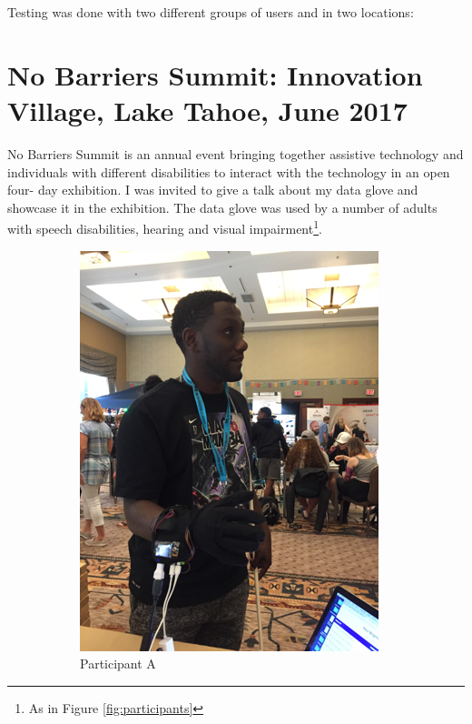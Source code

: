 Testing was done with two different groups of users and in two locations:

\section{No Barriers Summit: Innovation Village, Lake Tahoe, June 2017}

No Barriers Summit is an annual event bringing together assistive technology and individuals with different disabilities to interact with the technology in an open four- day exhibition. I was invited to give a talk about my data glove and showcase it in the exhibition. The data glove was used by a number of adults with speech disabilities, hearing and visual impairment\footnote{As in Figure \ref{fig:participants}}.

\begin{figure}
    \centering
    \begin{subfigure}{.4\linewidth}
        \centering
        \setlength\figureheight{\linewidth}
        \setlength\figurewidth{\linewidth}
        \includegraphics{./assets/img/ParticipantA}
        \caption{Participant A}
        \label{fig:participanta}
    \end{subfigure}
    \hspace{1cm}
    \begin{subfigure}{.4\linewidth}
        \centering
        \setlength\figureheight{\linewidth}
        \setlength\figurewidth{\linewidth}

\end{subfigure}
\end{figure}
